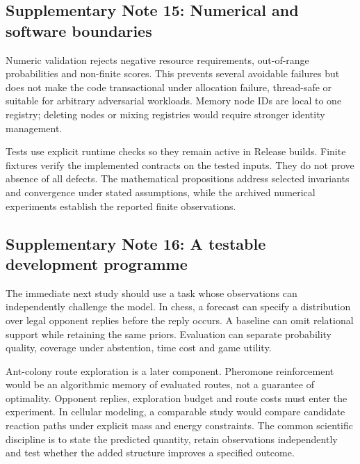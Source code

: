 \documentclass[10pt,a4paper]{article}
\begin{document}
\subsection*{Supplementary Note 15: Numerical and software boundaries}
Numeric validation rejects negative resource requirements, out-of-range probabilities and non-finite scores. This prevents several avoidable failures but does not make the code transactional under allocation failure, thread-safe or suitable for arbitrary adversarial workloads. Memory node IDs are local to one registry; deleting nodes or mixing registries would require stronger identity management.

Tests use explicit runtime checks so they remain active in Release builds. Finite fixtures verify the implemented contracts on the tested inputs. They do not prove absence of all defects. The mathematical propositions address selected invariants and convergence under stated assumptions, while the archived numerical experiments establish the reported finite observations.

\subsection*{Supplementary Note 16: A testable development programme}
The immediate next study should use a task whose observations can independently challenge the model. In chess, a forecast can specify a distribution over legal opponent replies before the reply occurs. A baseline can omit relational support while retaining the same priors. Evaluation can separate probability quality, coverage under abstention, time cost and game utility.

Ant-colony route exploration is a later component. Pheromone reinforcement would be an algorithmic memory of evaluated routes, not a guarantee of optimality. Opponent replies, exploration budget and route costs must enter the experiment. In cellular modeling, a comparable study would compare candidate reaction paths under explicit mass and energy constraints. The common scientific discipline is to state the predicted quantity, retain observations independently and test whether the added structure improves a specified outcome.
\end{document}

